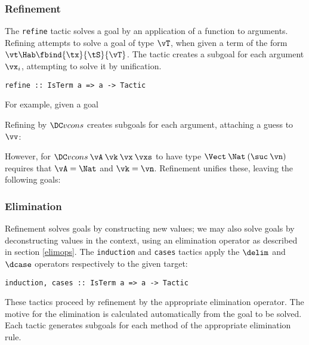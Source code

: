 \subsubsection{Refinement}
The \texttt{refine} tactic solves a goal by an application of a
function to arguments. Refining attempts to solve a goal of type
$\vT$, when given a term of the form $\vt\Hab\fbind{\tx}{\tS}{\vT}$. The tactic
creates a subgoal for each argument $\vx_i$, attempting to solve it by
unification.
%
\begin{verbatim}
refine :: IsTerm a => a -> Tactic
\end{verbatim}
%
For example, given a goal
\DM{
\Axiom{
\hole{\vv}{\Vect\:\Nat\:(\suc\:\vn)}}
}

\noindent
Refining by $\Vcons$ creates subgoals for each argument, attaching
a guess to $\vv$:
\DM{
\Axiom{
\AR{
\hole{\vA}{\Type}\\
\hole{\vk}{\Nat}\\
\hole{\vx}{\vA}\\
\hole{\vxs}{\Vect\:\vA\:\vk}\\
\guess{\vv}{\Vect\:\Nat\:(\suc\:\vn)}{\Vcons\:\vA\:\vk\:\vx\:\vxs}
}
}
}

\noindent
However, for $\Vcons\:\vA\:\vk\:\vx\:\vxs$ to have type
$\Vect\:\Nat\:(\suc\:\vn)$ requires that $\vA=\Nat$ and $\vk=\vn$.
Refinement unifies these, leaving the
following goals:
\DM{
\Axiom{
\AR{
\hole{\vx}{\Nat}\\
\hole{\vxs}{\Vect\:\Nat\:\vn}\\
\guess{\vv}{\Vect\:\Nat\:(\suc\:\vn)}{\Vcons\:\Nat\:\vn\:\vx\:\vxs}
}
}
}


\subsubsection{Elimination}
Refinement solves goals by constructing new values; we may also solve
goals by deconstructing values in the context, using an elimination
operator as described in section \ref{elimops}. The \texttt{induction}
and \texttt{cases} tactics apply the $\delim$ and $\dcase$ operators
respectively to the given target:
%
\begin{verbatim}
induction, cases :: IsTerm a => a -> Tactic
\end{verbatim}
%
These tactics proceed by refinement by the appropriate elimination
operator. The motive for the elimination is calculated automatically
from the goal to be solved. Each tactic generates subgoals for each
method of the appropriate elimination rule.

